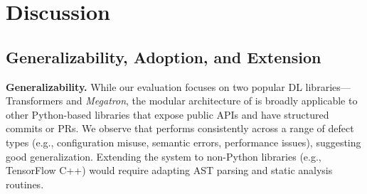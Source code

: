 \section{Discussion}
\label{sec:discussion}







\subsection{Generalizability, Adoption, and Extension}
\textbf{Generalizability.}
While our evaluation focuses on two popular DL libraries—Transformers and \textit{Megatron}, the modular architecture of \appname is broadly applicable to other Python-based libraries that expose public APIs and have structured commits or PRs.
We observe that \appname performs consistently across a range of defect types (e.g., configuration misuse, semantic errors, performance issues), suggesting good generalization. Extending the system to non-Python libraries (e.g., TensorFlow C++) would require adapting AST parsing and static analysis routines.

